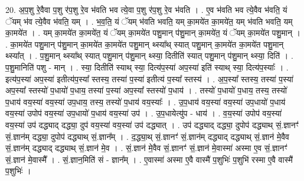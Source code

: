 \documentclass[17pt]{extarticle}
\begin{document}
20. अ॒प॒शु रे॒वैवा प॒शु र॑प॒शु रे॒व भ॑वति भव त्ये॒वा प॒शु र॑प॒शु रे॒व भ॑वति । . ए॒व भ॑वति भव त्ये॒वैव भ॑वति॒ यं ॅयम् भ॑व त्ये॒वैव भ॑वति॒ यम् । . भ॒व॒ति॒ यं ॅयम् भ॑वति भवति॒ यम् का॒मये॑त का॒मये॑त॒ यम् भ॑वति भवति॒ यम् का॒मये॑त । . यम् का॒मये॑त का॒मये॑त॒ यं ॅयम् का॒मये॑त पशु॒मान् प॑शु॒मान् का॒मये॑त॒ यं ॅयम् का॒मये॑त पशु॒मान् । . का॒मये॑त पशु॒मान् प॑शु॒मान् का॒मये॑त का॒मये॑त पशु॒मान् थ्स्या᳚थ् स्यात् पशु॒मान् का॒मये॑त का॒मये॑त पशु॒मान् थ्स्या᳚त् । . प॒शु॒मान् थ्स्या᳚थ् स्यात् पशु॒मान् प॑शु॒मान् थ्स्या॒ दितीति॑ स्यात् पशु॒मान् प॑शु॒मान् थ्स्या॒ दिति॑ । . प॒शु॒मानिति॑ पशु - मान् । . स्या॒ दितीति॑ स्याथ् स्या॒ दित्य॑प॒स्या॑ अप॒स्या॑ इति॑ स्याथ् स्या॒ दित्य॑प॒स्याः᳚ । . इत्य॑प॒स्या॑ अप॒स्या॑ इतीत्य॑प॒स्या᳚ स्तस्य॒ तस्या॑ प॒स्या॑ इतीत्य॑ प॒स्या᳚ स्तस्य॑ । . अ॒प॒स्या᳚ स्तस्य॒ तस्या॑ प॒स्या॑ अप॒स्या᳚ स्तस्यो॑ प॒धायो॑ प॒धाय॒ तस्या॑ प॒स्या॑ अप॒स्या᳚ स्तस्यो॑ प॒धाय॑ । . तस्यो॑ प॒धायो॑ प॒धाय॒ तस्य॒ तस्यो॑ प॒धाय॑ वय॒स्या॑ वय॒स्या॑ उप॒धाय॒ तस्य॒ तस्यो॑ प॒धाय॑ वय॒स्याः᳚ । . उ॒प॒धाय॑ वय॒स्या॑ वय॒स्या॑ उप॒धायो॑ प॒धाय॑ वय॒स्या॑ उपोप॑ वय॒स्या॑ उप॒धायो॑ प॒धाय॑ वय॒स्या॑ उप॑ । . उ॒प॒धायेत्यु॑प - धाय॑ । . व॒य॒स्या॑ उपोप॑ वय॒स्या॑ वय॒स्या॑ उप॑ दद्ध्याद् दद्ध्या॒ दुप॑ वय॒स्या॑ वय॒स्या॑ उप॑ दद्ध्यात् । . उप॑ दद्ध्याद् दद्ध्या॒ दुपोप॑ दद्ध्याथ् सं॒.ज्ञानꣳ॑ सं॒.ज्ञान॑म् दद्ध्या॒ दुपोप॑ दद्ध्याथ् सं॒.ज्ञान᳚म् । . द॒द्ध्या॒थ् सं॒.ज्ञानꣳ॑ सं॒.ज्ञान॑म् दद्ध्याद् दद्ध्याथ् सं॒.ज्ञान॑ मे॒वैव सं॒.ज्ञान॑म् दद्ध्याद् दद्ध्याथ् सं॒.ज्ञान॑ मे॒व । . सं॒.ज्ञान॑ मे॒वैव सं॒.ज्ञानꣳ॑ सं॒.ज्ञान॑ मे॒वास्मा॑ अस्मा ए॒व सं॒.ज्ञानꣳ॑ सं॒.ज्ञान॑ मे॒वास्मै᳚ । . सं॒.ज्ञान॒मिति॑ सं - ज्ञान᳚म् । . ए॒वास्मा॑ अस्मा ए॒वै वास्मै॑ प॒शुभिः॑ प॒शुभि॑ रस्मा ए॒वै वास्मै॑ प॒शुभिः॑ । \newline
\end{document}
